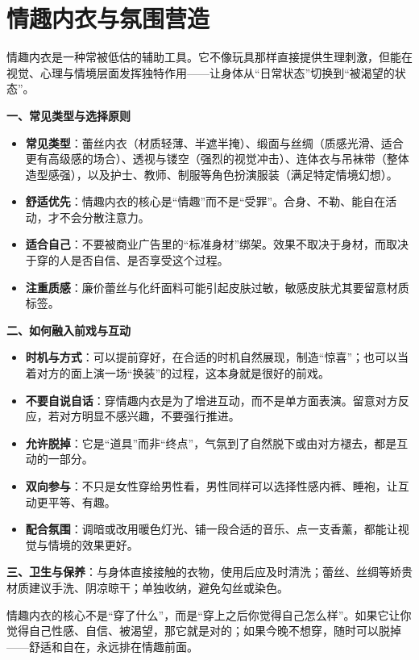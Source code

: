 \documentclass[12pt,UTF8]{ctexbook}
\begin{document}
\section{情趣内衣与氛围营造}

情趣内衣是一种常被低估的辅助工具。它不像玩具那样直接提供生理刺激，但能在视觉、心理与情境层面发挥独特作用——让身体从“日常状态”切换到“被渴望的状态”。

\textbf{一、常见类型与选择原则}

\begin{itemize}
\item \textbf{常见类型}：蕾丝内衣（材质轻薄、半遮半掩）、缎面与丝绸（质感光滑、适合更有高级感的场合）、透视与镂空（强烈的视觉冲击）、连体衣与吊袜带（整体造型感强），以及护士、教师、制服等角色扮演服装（满足特定情境幻想）。
\item \textbf{舒适优先}：情趣内衣的核心是“情趣”而不是“受罪”。合身、不勒、能自在活动，才不会分散注意力。
\item \textbf{适合自己}：不要被商业广告里的“标准身材”绑架。效果不取决于身材，而取决于穿的人是否自信、是否享受这个过程。
\item \textbf{注重质感}：廉价蕾丝与化纤面料可能引起皮肤过敏，敏感皮肤尤其要留意材质标签。
\end{itemize}

\textbf{二、如何融入前戏与互动}

\begin{itemize}
\item \textbf{时机与方式}：可以提前穿好，在合适的时机自然展现，制造“惊喜”；也可以当着对方的面上演一场“换装”的过程，这本身就是很好的前戏。
\item \textbf{不要自说自话}：穿情趣内衣是为了增进互动，而不是单方面表演。留意对方反应，若对方明显不感兴趣，不要强行推进。
\item \textbf{允许脱掉}：它是“道具”而非“终点”，气氛到了自然脱下或由对方褪去，都是互动的一部分。
\item \textbf{双向参与}：不只是女性穿给男性看，男性同样可以选择性感内裤、睡袍，让互动更平等、有趣。
\item \textbf{配合氛围}：调暗或改用暖色灯光、铺一段合适的音乐、点一支香薰，都能让视觉与情境的效果更好。
\end{itemize}

\textbf{三、卫生与保养}：与身体直接接触的衣物，使用后应及时清洗；蕾丝、丝绸等娇贵材质建议手洗、阴凉晾干；单独收纳，避免勾丝或染色。

\begin{tcolorbox}[colback=pink!5!white,colframe=red!50!black,title=贴心小叮咛]
情趣内衣的核心不是“穿了什么”，而是“穿上之后你觉得自己怎么样”。如果它让你觉得自己性感、自信、被渴望，那它就是对的；如果今晚不想穿，随时可以脱掉——舒适和自在，永远排在情趣前面。
\end{tcolorbox}
\end{document}
